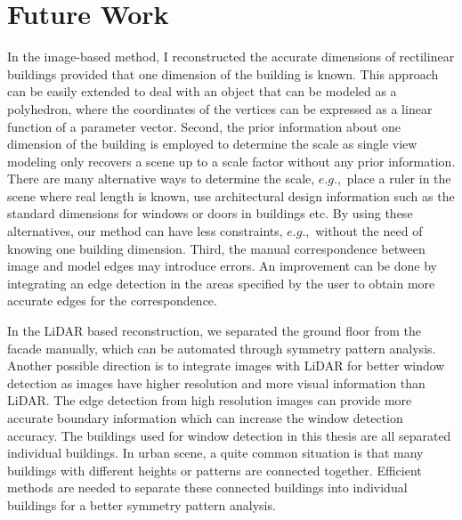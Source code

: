 \section{Future Work}

In the image-based method, I reconstructed the accurate dimensions of rectilinear buildings provided that one dimension of the building is known. This approach can be easily extended to deal with an object that can be modeled as a polyhedron, where the coordinates of the vertices can be expressed as a linear function of a parameter vector. Second, the
prior information about one dimension of the building is employed to determine the scale as single view modeling only recovers a scene up to a scale factor without any prior information. There are many alternative ways to determine the scale, $e.g.,$ place a ruler in the scene where real length is known, use architectural design information such as the standard dimensions for windows or doors in buildings etc. By using these alternatives, our method can have less constraints, $e.g.,$ without the need of knowing one building dimension. Third, the manual correspondence between image and model edges may introduce errors. An improvement can be done by
integrating an edge detection in the areas specified by the user to obtain more accurate edges for the correspondence. 

In the LiDAR based reconstruction, we separated the ground floor from the facade manually, which can be automated through symmetry pattern analysis. Another possible direction is to integrate images with LiDAR for better window detection as images have higher resolution and more visual information than LiDAR. The edge detection from high resolution images can provide more accurate boundary information which can increase the window detection accuracy. The buildings used for window detection in this thesis are all separated individual buildings. In urban scene, a quite common situation is that
many buildings with different heights or patterns are connected together. Efficient methods are needed to separate these connected buildings into individual buildings for a better symmetry pattern analysis. 
 
